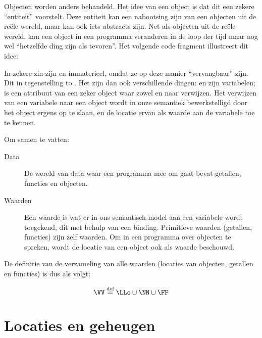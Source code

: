 Objecten worden anders behandeld. Het idee van een object is dat dit een zekere ``entiteit'' voorstelt. Deze entiteit kan een nabootsing zijn van een objecten uit de reële wereld, maar kan ook iets abstracts zijn. Net als objecten uit de reële wereld, kan een object in een programma veranderen in de loop der tijd maar nog wel ``hetzelfde ding zijn als tevoren''. Het volgende code fragment illustreert dit idee:
\begin{NoBreak}
  \codeFragmentCaption
\end{NoBreak}

In zekere zin zijn  en  immaterieel, omdat ze op deze manier ``vervangbaar'' zijn. Dit in tegenstelling to . Het zijn dan ook verschillende dingen:  en  zijn variabelen;  is een attribuut van een zeker object waar zowel  en  naar verwijzen.
Het verwijzen van een variabele naar een object wordt in onze semantiek bewerkstelligd door het object ergens op te slaan, en de locatie ervan als waarde aan de variabele toe te kennen.

Om samen te vatten:
\begin{description}
  \item[Data] De wereld van data waar een programma mee om gaat bevat getallen, functies en objecten.
  \item[Waarden] Een waarde is wat er in ons semantisch model aan een variabele wordt toegekend, dit met behulp van een binding. Primitieve waarden (getallen, functies) zijn zelf waarden. Om in een programma over objecten te spreken, wordt de locatie van een object ook als waarde beschouwd.
\end{description}

De definitie van de verzameling van alle waarden (locaties van objecten, getallen en functies) is dus als volgt:

\begin{equation*}
  \VV \DEF \LLo \cup \NN \cup \FF
\end{equation*}

\section{Locaties en geheugen}
\label{sec:locaties}

